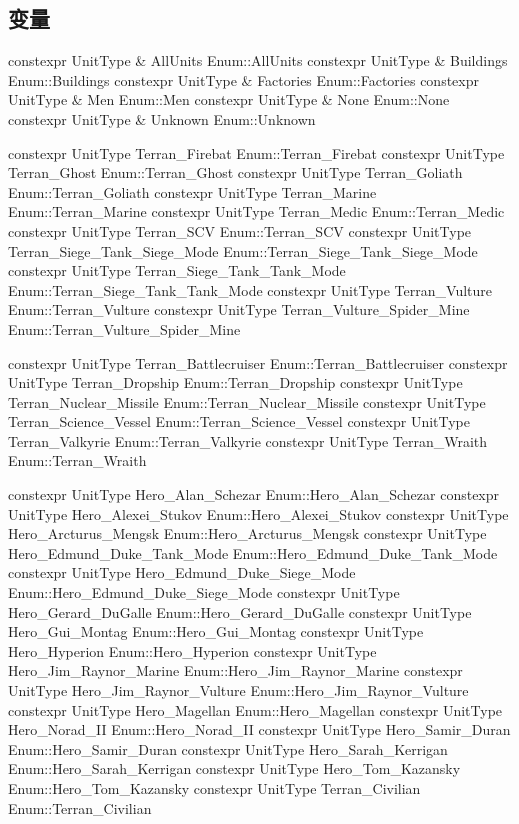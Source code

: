 \subsection{变量}
\begin{codebox}[变量]
constexpr UnitType & AllUnits {Enum::AllUnits}
constexpr UnitType & Buildings {Enum::Buildings}
constexpr UnitType & Factories {Enum::Factories}
constexpr UnitType & Men {Enum::Men}
constexpr UnitType & None {Enum::None}
constexpr UnitType & Unknown {Enum::Unknown}
\end{codebox}
\begin{codebox}[变量(人族地面单位)]
constexpr UnitType Terran_Firebat {Enum::Terran_Firebat}
constexpr UnitType Terran_Ghost {Enum::Terran_Ghost}
constexpr UnitType Terran_Goliath {Enum::Terran_Goliath}
constexpr UnitType Terran_Marine {Enum::Terran_Marine}
constexpr UnitType Terran_Medic {Enum::Terran_Medic}
constexpr UnitType Terran_SCV {Enum::Terran_SCV}
constexpr UnitType Terran_Siege_Tank_Siege_Mode {Enum::Terran_Siege_Tank_Siege_Mode}
constexpr UnitType Terran_Siege_Tank_Tank_Mode {Enum::Terran_Siege_Tank_Tank_Mode}
constexpr UnitType Terran_Vulture {Enum::Terran_Vulture}
constexpr UnitType Terran_Vulture_Spider_Mine {Enum::Terran_Vulture_Spider_Mine}
\end{codebox}
\begin{codebox}[变量(人族空中单位)]
constexpr UnitType Terran_Battlecruiser {Enum::Terran_Battlecruiser}
constexpr UnitType Terran_Dropship {Enum::Terran_Dropship}
constexpr UnitType Terran_Nuclear_Missile {Enum::Terran_Nuclear_Missile}
constexpr UnitType Terran_Science_Vessel {Enum::Terran_Science_Vessel}
constexpr UnitType Terran_Valkyrie {Enum::Terran_Valkyrie}
constexpr UnitType Terran_Wraith {Enum::Terran_Wraith}
\end{codebox}
\begin{codebox}[变量(人族英雄单位)]
constexpr UnitType Hero_Alan_Schezar {Enum::Hero_Alan_Schezar}
constexpr UnitType Hero_Alexei_Stukov {Enum::Hero_Alexei_Stukov}
constexpr UnitType Hero_Arcturus_Mengsk {Enum::Hero_Arcturus_Mengsk}
constexpr UnitType Hero_Edmund_Duke_Tank_Mode {Enum::Hero_Edmund_Duke_Tank_Mode}
constexpr UnitType Hero_Edmund_Duke_Siege_Mode {Enum::Hero_Edmund_Duke_Siege_Mode}
constexpr UnitType Hero_Gerard_DuGalle {Enum::Hero_Gerard_DuGalle}
constexpr UnitType Hero_Gui_Montag {Enum::Hero_Gui_Montag}
constexpr UnitType Hero_Hyperion {Enum::Hero_Hyperion}
constexpr UnitType Hero_Jim_Raynor_Marine {Enum::Hero_Jim_Raynor_Marine}
constexpr UnitType Hero_Jim_Raynor_Vulture {Enum::Hero_Jim_Raynor_Vulture}
constexpr UnitType Hero_Magellan {Enum::Hero_Magellan}
constexpr UnitType Hero_Norad_II {Enum::Hero_Norad_II}
constexpr UnitType Hero_Samir_Duran {Enum::Hero_Samir_Duran}
constexpr UnitType Hero_Sarah_Kerrigan {Enum::Hero_Sarah_Kerrigan}
constexpr UnitType Hero_Tom_Kazansky {Enum::Hero_Tom_Kazansky}
constexpr UnitType Terran_Civilian {Enum::Terran_Civilian}
\end{codebox}
